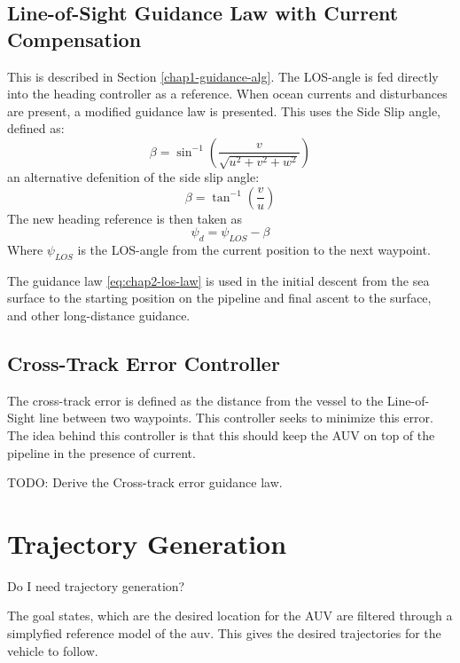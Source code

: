 	\subsection{Line-of-Sight Guidance Law with Current Compensation}
		This is described in Section \ref{chap1-guidance-alg}. The LOS-angle is fed directly into the 
		heading controller as a reference. When ocean currents and disturbances are present, a modified 
		guidance law is presented. This uses the Side Slip angle, defined as:
		\begin{equation}
			\label{eq:chap2-sideslip}
			\beta = \sin^{-1} ( \frac{v}{\sqrt{u^2 + v^2 + w^2}})
		\end{equation}
		an alternative defenition of the side slip angle:
		\begin{equation*}
			\beta = \tan^{-1} (\frac{v}{u})
		\end{equation*}
		The new heading reference is then taken as
		\begin{equation}
			\label{eq:chap2-los-law}
			\psi_d = \psi_{LOS} - \beta
		\end{equation}
		Where $\psi_{LOS}$ is the LOS-angle from the current position to the next waypoint.
		
		The guidance law \eqref{eq:chap2-los-law} is used in the initial descent from the sea surface to the 
		starting position on the pipeline and final ascent to the surface, and other long-distance guidance.
		
	\subsection{Cross-Track Error Controller}
		The cross-track error is defined as the distance from the vessel to the Line-of-Sight line between 
		two waypoints. This controller seeks to minimize this error. The idea behind this controller is that 
		this should keep the AUV on top of the pipeline in the presence of current.
		
		TODO: Derive the Cross-track error guidance law. \cite{cross-track}
		
		
		
	
\section{Trajectory Generation}
	Do I need trajectory generation? 	
	
	The goal states, which are the desired location for the AUV are filtered through a simplyfied
	reference model of the auv. This gives the desired trajectories for the vehicle to follow.

